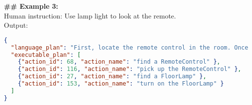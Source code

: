 \begin{tcolorbox}[colback=gray!5!white, colframe=gray!75!black, 
title={In-context examples for EB-ALFRED tasks excluding long horizon tasks}, boxrule=0.5mm, width=\textwidth, arc=3mm, auto outer arc=true]
\textbf{\#\# Example 3:}\\
Human instruction: Use lamp light to look at the remote.\\
Output:
\begin{lstlisting}[language=json]
{
  "language_plan": "First, locate the remote control in the room. Once the remote control is found, pick it up carefully. Next, search for the floor lamp and determine its location. After you have located the floor lamp, turn it on to provide sufficient light for examining the remote control.",
  "executable_plan": [
    {"action_id": 68, "action_name": "find a RemoteControl" },
    {"action_id": 116, "action_name": "pick up the RemoteControl" },
    {"action_id": 27, "action_name": "find a FloorLamp" },
    {"action_id": 153, "action_name": "turn on the FloorLamp" }
  ]
}
\end{lstlisting}
\end{tcolorbox}

